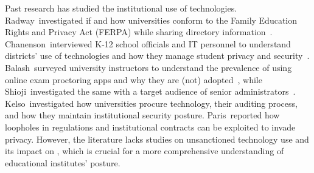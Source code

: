 Past research has studied the institutional use of technologies. Radway~\etal investigated if and how universities conform to the Family Education Rights and Privacy Act (FERPA) while sharing directory information~\cite{radway_investigation_2024}. Chanenson~\etal interviewed K-12 school officials and IT personnel to understand districts' use of technologies and how they manage student privacy and security~\cite{chanensonUncoveringPrivacySecurityK12CHI23}. Balash~\etal surveyed university instructors to understand the prevalence of using online exam proctoring apps and why they are (not) adopted~\cite{balashEducatorsPerspectives2023}, while Shioji~\etal investigated the same with a target audience of senior administrators~\cite{shiojiItsBeenLovely}. Kelso~\etal investigated how universities procure technology, their auditing process, and how they maintain institutional security posture. Paris~\etal reported how loopholes in regulations and institutional contracts can be exploited to invade privacy. However, the literature lacks studies on unsanctioned technology use and its impact on \SP, which is crucial for a more comprehensive understanding of educational institutes' \SP posture.
